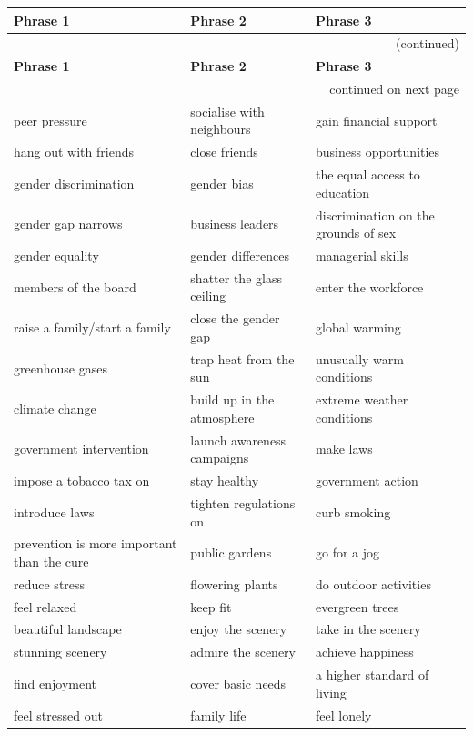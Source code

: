 \documentclass[10pt,a4paper]{article}
\begin{document}
\setlength{\tabcolsep}{8pt}
\renewcommand{\arraystretch}{1.3}
{\large
\begin{longtable}{@{}*{3}{p{}}@{}}
\toprule
\textbf{Phrase 1} & \textbf{Phrase 2} & \textbf{Phrase 3} \\ \midrule
\endfirsthead
\multicolumn{3}{r}{\footnotesize (continued)} \\
\toprule
\textbf{Phrase 1} & \textbf{Phrase 2} & \textbf{Phrase 3} \\ \midrule
\endhead
\midrule
\multicolumn{3}{r}{\footnotesize continued on next page} \\
\endfoot
\bottomrule
\endlastfoot
peer pressure & socialise with neighbours & gain financial support \\
hang out with friends & close friends & business opportunities \\
gender discrimination & gender bias & the equal access to education \\
gender gap narrows & business leaders & discrimination on the grounds of sex \\
gender equality & gender differences & managerial skills \\
members of the board & shatter the glass ceiling & enter the workforce \\
raise a family/start a family & close the gender gap & global warming \\
greenhouse gases & trap heat from the sun & unusually warm conditions \\
climate change & build up in the atmosphere & extreme weather conditions \\
government intervention & launch awareness campaigns & make laws \\
impose a tobacco tax on & stay healthy & government action \\
introduce laws & tighten regulations on & curb smoking \\
prevention is more important than the cure & public gardens & go for a jog \\
reduce stress & flowering plants & do outdoor activities \\
feel relaxed & keep fit & evergreen trees \\
beautiful landscape & enjoy the scenery & take in the scenery \\
stunning scenery & admire the scenery & achieve happiness \\
find enjoyment & cover basic needs & a higher standard of living \\
feel stressed out & family life & feel lonely \\

\end{longtable}}
\end{document}
